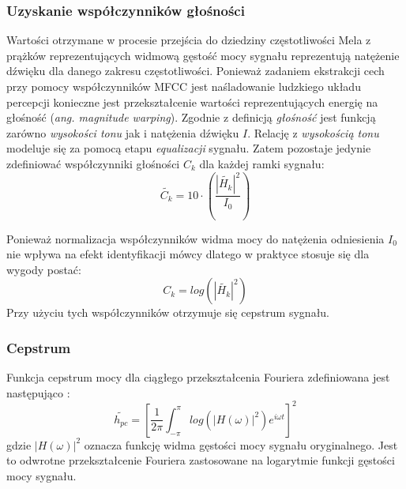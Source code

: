 \subsubsection{Uzyskanie współczynników głośności}
Wartości otrzymane w procesie przejścia do dziedziny częstotliwości Mela z prążków reprezentujących widmową gęstość mocy sygnału reprezentują natężenie dźwięku dla danego zakresu częstotliwości. Ponieważ zadaniem ekstrakcji cech przy pomocy współczynników MFCC jest naśladowanie ludzkiego układu percepcji konieczne jest przekształcenie wartości reprezentujących energię na głośność (\textit{ang. magnitude warping}). Zgodnie z definicją  \textit{głośność} jest funkcją zarówno \textit{wysokości tonu} jak i natężenia dźwięku $I$. Relację z \textit{wysokością tonu} modeluje się za pomocą etapu \textit{equalizacji} sygnału. Zatem pozostaje jedynie zdefiniować współczynniki głośności $ C_k $ \cite{fosr} dla każdej ramki sygnału:
\begin{equation}
  \tilde{C_k} = 10 \cdot \left( \frac{|\tilde{H_k}|^2}{I_0} \right) 
\end{equation}

Ponieważ normalizacja współczynników widma mocy do natężenia odniesienia $I_0$ nie wpływa na efekt identyfikacji mówcy dlatego w praktyce stosuje się dla wygody postać: 
\begin{equation}
  C_k = log \left(|\tilde{H_k}|^2 \right)
\end{equation}
Przy użyciu tych współczynników otrzymuje się cepstrum sygnału.

\subsubsection{Cepstrum}
\label{cepstrum}

Funkcja cepstrum mocy dla ciągłego przekształcenia Fouriera zdefiniowana jest następująco \cite{fosr}:
\begin{equation}
    \tilde{h_{pc}} = \left[\frac{1}{2\pi}\int_{-\pi}^{\pi}log\left(| H(\omega)  |^2\right)e^{i \omega t}\right]^2
\end{equation}
gdzie $ |H(\omega)|^2 $ oznacza funkcję widma gęstości mocy sygnału oryginalnego. Jest to odwrotne przekształcenie Fouriera zastosowane na logarytmie funkcji gęstości mocy sygnału.
   
